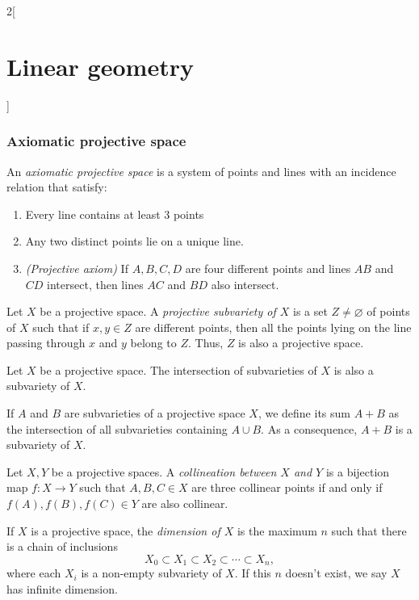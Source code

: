 \documentclass[../../../main.tex]{subfiles}
\begin{document}
\begin{multicols}{2}[\section{Linear geometry}]
    \subsubsection*{Axiomatic projective space}
    \begin{definition}
        An \textit{axiomatic projective space} is a system of points and lines with an incidence relation that satisfy:
        \begin{enumerate}
            \item Every line contains at least 3 points
            \item Any two distinct points lie on a unique line.
            \item \textit{(Projective axiom)} If $A,B,C,D$ are four different points and lines $AB$ and $CD$ intersect, then lines $AC$ and $BD$ also intersect.
        \end{enumerate}
    \end{definition}
    \begin{definition}
        Let $X$ be a projective space. A \textit{projective subvariety of $X$} is a set $Z\ne\varnothing$ of points of $X$ such that if $x,y\in Z$ are different points, then all the points lying on the line passing through $x$ and $y$ belong to $Z$. Thus, $Z$ is also a projective space.
    \end{definition}
    \begin{prop}
        Let $X$ be a projective space. The intersection of subvarieties of $X$ is also a subvariety of $X$.
    \end{prop}
    \begin{prop}
        If $A$ and $B$ are subvarieties of a projective space $X$, we define its sum $A+B$ as the intersection of all subvarieties containing $A\cup B$. As a consequence, $A+B$ is a subvariety of $X$.
    \end{prop}
    \begin{definition}
        Let $X,Y$ be a projective spaces. A \textit{collineation between $X$ and $Y$} is a bijection map $f:X\rightarrow Y$ such that $A,B,C\in X$ are three collinear points if and only if $f(A),f(B),f(C)\in Y$ are also collinear.
    \end{definition}
    \begin{definition}
        If $X$ is a projective space, the \textit{dimension of $X$} is the maximum $n$ such that there is a chain of inclusions $$X_0\subset X_1\subset X_2 \subset\cdots\subset X_n,$$ where each $X_i$ is a non-empty subvariety of $X$. If this $n$ doesn't exist, we say $X$ has infinite dimension.

\end{definition}
\end{multicols}
\end{document}
